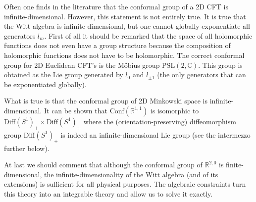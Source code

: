 
    \begin{remark}
        Often one finds in the literature that the conformal group of a 2D CFT is infinite-dimensional. However, this statement is not entirely true. It is true that the Witt algebra is infinite-dimensional, but one cannot globally exponentiate all generators $l_m$. First of all it should be remarked that the space of all holomorphic functions does not even have a group structure because the composition of holomorphic functions does not have to be holomorphic. The correct conformal group for 2D Euclidean CFT's is the M\"obius group $\text{PSL}(2, \mathbb{C})$. This group is obtained as the Lie group generated by $l_0$ and $l_{\pm1}$ (the only generators that can be exponentiated globally).

        What is true is that the conformal group of 2D Minkowski space is infinite-dimensional. It can be shown that $\text{Conf}(\mathbb{R}^{1, 1})$ is isomorphic to $\text{Diff}(S^1)_+\times\text{Diff}(S^1)_+$ where the (orientation-preserving) diffeomorphism group Diff$(S^1)_+$ is indeed an infinite-dimensional Lie group (see the intermezzo further below).

        At last we should comment that although the conformal group of $\mathbb{R}^{2, 0}$ is finite-dimensional, the infinite-dimensionality of the Witt algebra (and of its extensions) is sufficient for all physical purposes. The algebraic constraints turn this theory into an integrable theory and allow us to solve it exactly.
    \end{remark}


